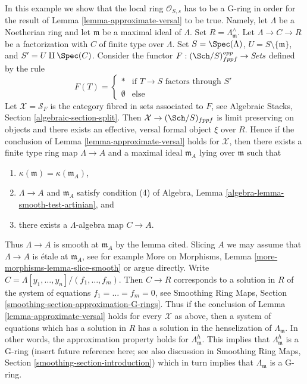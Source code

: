 \begin{example}
\label{example-approximate-versal-implies}
In this example we show that the local ring $\mathcal{O}_{S, s}$ has to be
a G-ring in order for the result of Lemma \ref{lemma-approximate-versal} to
be true. Namely, let $\Lambda$ be a Noetherian ring and let $\mathfrak m$
be a maximal ideal of $\Lambda$. Set $R = \Lambda_\mathfrak m^\wedge$. Let
$\Lambda \to C \to R$ be a factorization with $C$ of finite type over
$\Lambda$. Set $S = \Spec(\Lambda)$, $U = S \setminus \{\mathfrak m\}$, and
$S' = U \amalg \Spec(C)$. Consider the functor
$F : (\Sch/S)_{fppf}^{opp} \to \textit{Sets}$ defined by the rule
$$
F(T) = 
\left\{
\begin{matrix}
* & \text{if }T \to S\text{ factors through }S' \\
\emptyset & \text{else}
\end{matrix}
\right.
$$
Let $\mathcal{X} = \mathcal{S}_F$ is the category fibred in sets associated
to $F$, see Algebraic Stacks, Section \ref{algebraic-section-split}.
Then $\mathcal{X} \to (\Sch/S)_{fppf}$ is limit preserving on objects and
there exists an effective, versal formal object $\xi$ over $R$.
Hence if the conclusion of Lemma \ref{lemma-approximate-versal} holds
for $\mathcal{X}$, then there exists a finite type ring map $\Lambda \to A$
and a maximal ideal $\mathfrak m_A$ lying over $\mathfrak m$ such that
\begin{enumerate}
\item $\kappa(\mathfrak m) = \kappa(\mathfrak m_A)$,
\item $\Lambda \to A$ and $\mathfrak m_A$ satisfy condition (4) of
Algebra, Lemma \ref{algebra-lemma-smooth-test-artinian}, and
\item there exists a $\Lambda$-algebra map $C \to A$.
\end{enumerate}
Thus $\Lambda \to A$ is smooth at $\mathfrak m_A$ by the lemma cited.
Slicing $A$ we may assume that $\Lambda \to A$ is \'etale at
$\mathfrak m_A$, see for example
More on Morphisms, Lemma \ref{more-morphisms-lemma-slice-smooth}
or argue directly. Write $C = \Lambda[y_1, \ldots, y_n]/(f_1, \ldots, f_m)$.
Then $C \to R$ corresponds to a solution in $R$ of the system of equations
$f_1 = \ldots = f_m = 0$, see Smoothing Ring Maps, Section
\ref{smoothing-section-approximation-G-rings}.
Thus if the conclusion of
Lemma \ref{lemma-approximate-versal} holds for every $\mathcal{X}$ as
above, then a system of equations which has a solution in $R$ has a
solution in the henselization of $\Lambda_{\mathfrak m}$.
In other words, the approximation property holds for
$\Lambda_{\mathfrak m}^h$. This implies that $\Lambda_{\mathfrak m}^h$
is a G-ring (insert future reference here; see also discussion in
Smoothing Ring Maps, Section \ref{smoothing-section-introduction})
which in turn implies that $\Lambda_{\mathfrak m}$ is a G-ring.
\end{example}







